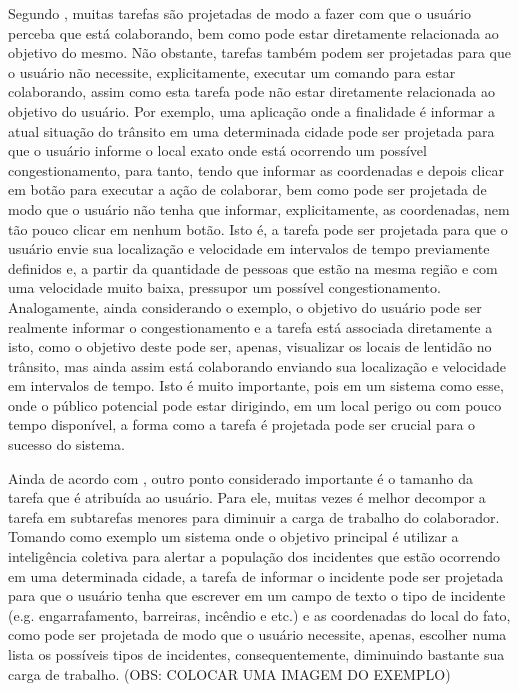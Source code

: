 Segundo \cite{Hu2012}, muitas tarefas são projetadas de modo a fazer com que o usuário perceba que está colaborando, bem como pode estar diretamente relacionada ao objetivo do mesmo. Não obstante, tarefas também podem ser projetadas para que o usuário não necessite, explicitamente, executar um comando para estar colaborando, assim como esta tarefa pode não estar diretamente relacionada ao objetivo do usuário. Por exemplo, uma aplicação onde a finalidade é informar a atual situação do trânsito em uma determinada cidade pode ser projetada para que o usuário informe o local exato onde está ocorrendo um possível congestionamento, para tanto, tendo que informar as coordenadas e depois clicar em botão para executar a ação de colaborar, bem como pode ser projetada de modo que o usuário não tenha que informar, explicitamente, as coordenadas, nem tão pouco clicar em nenhum botão. Isto é, a tarefa pode ser projetada para que o usuário envie sua localização e velocidade em intervalos de tempo previamente definidos e, a partir da quantidade de pessoas que estão na mesma região e com uma velocidade muito baixa, pressupor um possível congestionamento. Analogamente, ainda considerando o exemplo, o objetivo do usuário pode ser realmente informar o congestionamento e a tarefa está associada diretamente a isto, como o objetivo deste pode ser, apenas, visualizar os locais de lentidão no trânsito, mas ainda assim está colaborando enviando sua localização e velocidade em intervalos de tempo. Isto é muito importante, pois em um sistema como esse, onde o público potencial pode estar dirigindo, em um local perigo ou com pouco tempo disponível, a forma como a tarefa é projetada pode ser crucial para o sucesso do sistema.    

Ainda de acordo com \cite{Hu2012}, outro ponto considerado importante é o tamanho da tarefa que é atribuída ao usuário. Para ele, muitas vezes é melhor decompor a tarefa em subtarefas menores para diminuir a carga de trabalho do colaborador. Tomando como exemplo um sistema onde o objetivo principal é utilizar a inteligência coletiva para alertar a população dos incidentes que estão ocorrendo em uma determinada cidade, a tarefa de informar o incidente pode ser projetada para que o usuário tenha que escrever em um campo de texto o tipo de incidente (e.g. engarrafamento, barreiras, incêndio e etc.) e as coordenadas do local do fato, como pode ser projetada de modo que o usuário necessite, apenas, escolher numa lista os possíveis tipos de incidentes, consequentemente, diminuindo bastante sua carga de trabalho.  (OBS: COLOCAR UMA IMAGEM DO EXEMPLO)


